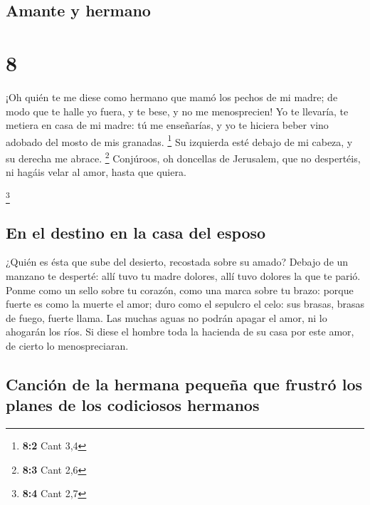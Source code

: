 \hypertarget{amante-y-hermano}{%
\subsection{Amante y hermano}\label{amante-y-hermano}}

\hypertarget{section-7}{%
\section{8}\label{section-7}}

 ¡Oh quién te me diese como hermano que mamó los pechos de
mi madre; de modo que te halle yo fuera, y te bese, y no me
menosprecien!  Yo te llevaría, te metiera en casa de mi
madre: tú me enseñarías, y yo te hiciera beber vino adobado del mosto de
mis granadas. \footnote{\textbf{8:2} Cant 3,4}  Su izquierda
esté debajo de mi cabeza, y su derecha me abrace. \footnote{\textbf{8:3}
  Cant 2,6}  Conjúroos, oh doncellas de Jerusalem, que no
despertéis, ni hagáis velar al amor, hasta que quiera.

\footnote{\textbf{8:4} Cant 2,7}

\hypertarget{en-el-destino-en-la-casa-del-esposo}{%
\subsection{En el destino en la casa del
esposo}\label{en-el-destino-en-la-casa-del-esposo}}

 ¿Quién es ésta que sube del desierto, recostada sobre su
amado? Debajo de un manzano te desperté: allí tuvo tu madre dolores,
allí tuvo dolores la que te parió.  Ponme como un sello
sobre tu corazón, como una marca sobre tu brazo: porque fuerte es como
la muerte el amor; duro como el sepulcro el celo: sus brasas, brasas de
fuego, fuerte llama.  Las muchas aguas no podrán apagar el
amor, ni lo ahogarán los ríos. Si diese el hombre toda la hacienda de su
casa por este amor, de cierto lo menospreciaran.

\hypertarget{canciuxf3n-de-la-hermana-pequeuxf1a-que-frustruxf3-los-planes-de-los-codiciosos-hermanos}{%
\subsection{Canción de la hermana pequeña que frustró los planes de los
codiciosos
hermanos}\label{canciuxf3n-de-la-hermana-pequeuxf1a-que-frustruxf3-los-planes-de-los-codiciosos-hermanos}}

